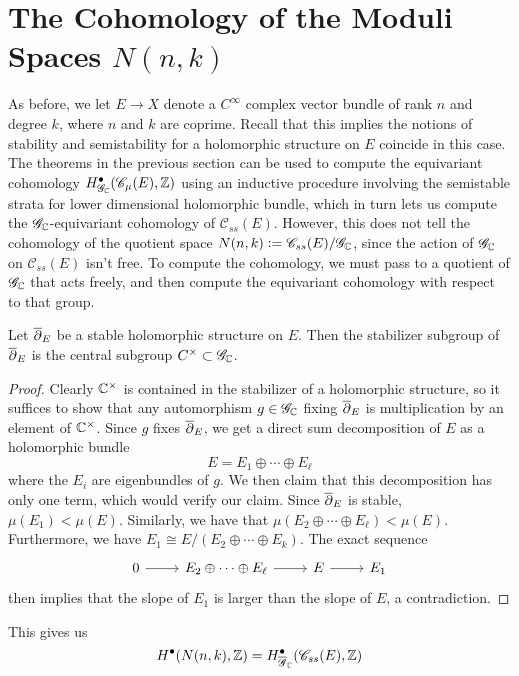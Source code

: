 %
\section{The Cohomology of the Moduli Spaces $N(n,k)$}
%
As before, we let $E \to X$ denote a $C^\infty$ complex vector bundle of
rank $n$ and degree $k$, where $n$ and $k$ are coprime. Recall that this
implies the notions of stability and semistability for a holomorphic structure
on $E$ coincide in this case.\\

The theorems in the previous section can be used to compute the
equivariant cohomology $H^\bullet_{\mathscr{G}_{\mathbb{C}}}(\mathscr{C}_\mu(E),\mathbb{Z})$
using an inductive procedure involving the semistable strata for lower dimensional
holomorphic bundle, which in turn lets us compute the $\mathscr{G}_{\mathbb{C}}$-equivariant
cohomology of $\mathscr{C}_{ss}(E)$. However, this does not tell the cohomology
of the quotient space $N(n,k) \vcentcolon= \mathscr{C}_{ss}(E)/\mathscr{G}_{\mathbb{C}}$, since
the action of $\mathscr{G}_{\mathbb{C}}$ on $\mathscr{C}_{ss}(E)$ isn't free. To compute
the cohomology, we must pass to a quotient of $\mathscr{G}_{\mathbb{C}}$ that acts freely,
and then compute the equivariant cohomology with respect to that group.
%
\begin{prop}
Let $\overline{\partial}_E$ be a stable holomorphic structure on $E$. Then the stabilizer
subgroup of $\overline{\partial}_E$ is the central subgroup $C^\times \subset \mathscr{G}_{\mathbb{C}}$.
\end{prop}
%
\begin{proof}
Clearly $\mathbb{C}^\times$ is contained in the stabilizer of a holomorphic structure,
so it suffices to show that any automorphism $g \in \mathscr{G}_{\mathbb{C}}$ fixing
$\overline{\partial}_E$ is multiplication by an element of $\mathbb{C}^\times$. Since $g$
fixes $\overline{\partial}_E$, we get a direct sum decomposition of $E$ as a holomorphic bundle
\[
E = E_1 \oplus \cdots \oplus E_\ell
\]
where the $E_i$ are eigenbundles of $g$. We then claim that this decomposition
has only one term, which would verify our claim. Since $\overline{\partial}_E$ is stable,
$\mu(E_1) < \mu(E)$. Similarly, we have that
$\mu(E_2 \oplus\cdots\oplus E_\ell) < \mu(E)$.
Furthermore, we have $E_1 \cong E/(E_2\oplus\cdots\oplus E_k)$.
The exact sequence
\[\begin{tikzcd}
0 \ar[r] & E_2\oplus\cdots\oplus E_\ell \ar[r] & E \ar[r] & E_1
\end{tikzcd}\]
then implies that the slope of $E_1$ is larger than the slope of $E$, a contradiction.
\end{proof}
%
This gives us
\[
H^\bullet(N(n,k),\mathbb{Z}) = H^\bullet_{\overline{\mathscr{G}}_{\mathbb{C}}}(\mathscr{C}_{ss}(E),\mathbb{Z})
\]
